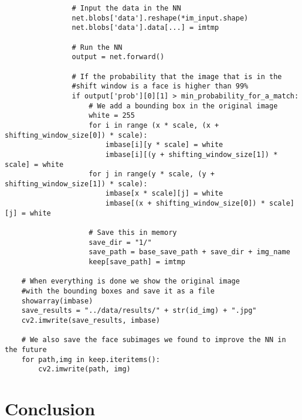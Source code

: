 \documentclass[french]{article}
\begin{document}
\begin{verbatim}
                # Input the data in the NN
                net.blobs['data'].reshape(*im_input.shape)
                net.blobs['data'].data[...] = imtmp
                
                # Run the NN
                output = net.forward()
                
                # If the probability that the image that is in the
                #shift window is a face is higher than 99%
                if output['prob'][0][1] > min_probability_for_a_match:
                    # We add a bounding box in the original image
                    white = 255
                    for i in range (x * scale, (x + shifting_window_size[0]) * scale):
                        imbase[i][y * scale] = white
                        imbase[i][(y + shifting_window_size[1]) * scale] = white
                    for j in range(y * scale, (y + shifting_window_size[1]) * scale):
                        imbase[x * scale][j] = white
                        imbase[(x + shifting_window_size[0]) * scale][j] = white

                    # Save this in memory
                    save_dir = "1/"
                    save_path = base_save_path + save_dir + img_name
                    keep[save_path] = imtmp
    
    # When everything is done we show the original image
    #with the bounding boxes and save it as a file
    showarray(imbase)
    save_results = "../data/results/" + str(id_img) + ".jpg"
    cv2.imwrite(save_results, imbase)
    
    # We also save the face subimages we found to improve the NN in the future
    for path,img in keep.iteritems():
        cv2.imwrite(path, img)
\end{verbatim}

\section{Conclusion}
\end{document}
